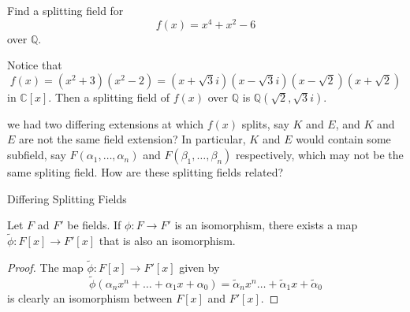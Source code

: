 \documentclass[notoc,notitlepage,nobib]{tufte-book}
\begin{document}
\begin{eg}
  Find a splitting field for
  \begin{equation*}
    f(x) = x^4 + x^2 - 6
  \end{equation*}
  over $\mathbb{Q}$.
\end{eg}

\begin{solution}
  Notice that
  \begin{equation*}
    f(x) = (x^2 + 3)(x^2 - 2) = (x + \sqrt{3} i)(x - \sqrt{3}i)(x - \sqrt{2})(x + \sqrt{2})
  \end{equation*}
  in $\mathbb{C}[x]$. Then a splitting field of $f(x)$ over $\mathbb{Q}$ is 
  $\mathbb{Q}(\sqrt{2}, \sqrt{3}i)$.
\end{solution}

 we had two differing extensions at which $f(x)$ splits, say $K$ and
$E$, and $K$ and $E$ are not the same field extension? In particular, $K$ and $E$ would contain
some subfield, say $F(\alpha_1, \ldots, \alpha_n)$ and $F(\beta_1, \ldots, \beta_n)$
respectively, which may not be the same spliting field. How are these splitting fields related?

\begin{marginfigure}
  \centering
  \caption{Differing Splitting Fields}
  \label{fig:differing_splitting_fields}
\end{marginfigure}

\begin{lemma}\label{lemma:isomorphic_fields_have_isomorphic_polynomial_rings}
  Let $F$ ad $F'$ be fields. If $\phi : F \to F'$ is an isomorphism, there exists a map
  $\tilde{\phi} : F[x] \to F'[x]$ that is also an isomorphism.
\end{lemma}

\begin{proof}
  The map $\tilde{\phi} : F[x] \to F'[x]$ given by
  \begin{equation*}
    \tilde{\phi}(\alpha_n x^n + \hdots + \alpha_1 x + \alpha_0) = \tilde{\alpha}_n x^n \hdots + \tilde{\alpha}_1 x + \tilde{\alpha}_0
  \end{equation*}
  is clearly an isomorphism between $F[x]$ and $F'[x]$.
\end{proof}
\end{document}
